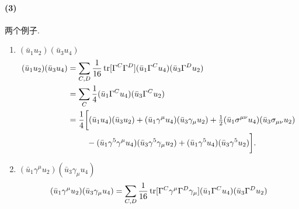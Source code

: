 \paragraph*{(3)} 两个例子.
\begin{enumerate}
  \item $(\bar{u}_1 u_2)(\bar{u}_3 u_4)$
        \begin{equation}
          \begin{aligned}
            (\bar{u}_1 u_2)(\bar{u}_3 u_4) & = \sum_{C,D} \frac{1}{16} \operatorname{tr}[\Gamma^C \Gamma^D](\bar{u}_1\Gamma^C u_4)(\bar{u}_3\Gamma^D u_2)                                                                                     \\
                                           & = \sum_C \frac{1}{4}(\bar{u}_1\Gamma^C u_4)(\bar{u}_3\Gamma^C u_2)                                                                                                                 \\
                                           & = \frac{1}{4}\biggl[(\bar{u}_1 u_4)(\bar{u}_3 u_2) + (\bar{u}_1\gamma^\mu u_4)(\bar{u}_3\gamma_\mu u_2) + \tfrac{1}{2}(\bar{u}_1\sigma^{\mu\nu} u_4)(\bar{u}_3\sigma_{\mu\nu} u_2) \\
                                           & \qquad\ - (\bar{u}_1\gamma^5\gamma^\mu u_4)(\bar{u}_3\gamma^5\gamma_\mu u_2) +(\bar{u}_1\gamma^5 u_4)(\bar{u}_3\gamma^5 u_2) \biggr].
          \end{aligned}
        \end{equation}
  \item $(\bar{u}_1\gamma^\mu u_2)(\bar{u}_3\gamma_\mu u_4)$
        \begin{equation}
          (\bar{u}_1\gamma^\mu u_2)(\bar{u}_3\gamma_\mu u_4) = \sum_{C,D} \frac{1}{16} \operatorname{tr}[\Gamma^C\gamma^\mu\Gamma^D\gamma_\mu](\bar{u}_1\Gamma^C u_4)(\bar{u}_3\Gamma^D u_2)
        \end{equation}
\end{enumerate}